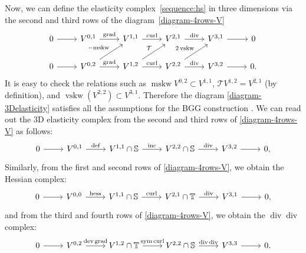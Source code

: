 \documentclass[final]{amsart}%
\newcommand{\0}{\mathaccent23}
\newcommand\inc{\operatorname{inc}}
\newcommand\vskw{\operatorname{vskw}}
\newcommand\mskw{\operatorname{mskw}}
\newcommand\sym{\operatorname{sym}}
\newcommand\grad{\operatorname{grad}}
\newcommand\deff{\operatorname{def}}
\renewcommand\div{\operatorname{div}}
\newcommand\curl{\operatorname{curl}}
\newcommand\dev{\mathrm{dev}}
\newcommand\hess{\operatorname{hess}}
\begin{document}
Now, we can define the elasticity complex~\eqref{sequence:hs} in three dimensions via the second and third rows of the diagram~\eqref{diagram-4rows-V}
\begin{equation}
  \label{diagram-3Delasticity}
  \begin{tikzcd}
  0 \arrow{r} &V^{0, 1} \arrow{r}{\grad} &V^{1, 1} \arrow{r}{\curl} & V^{2, 1} \arrow{r}{\div} & V^{3, 1} \arrow{r}{}& 0\\
  0 \arrow{r}&
  V^{0, 2}
  \arrow{r}{\grad} \arrow[ur, "-\mathrm{mskw}"]&
  V^{1, 2}  \arrow{r}{\curl} \arrow[ur, "\mathcal{T}"]&V^{2, 2}  \arrow{r}{\div} \arrow[ur, "2\vskw"]&V^{3, 2}  \arrow{r}{} & 0.
 \end{tikzcd}
\end{equation}
It is easy to check the relations such as  $\mskw V^{0, 2}\subset V^{1, 1}$, $\mathcal{T} V^{1, 2}= V^{2, 1}$ (by definition), and $\vskw (V^{2, 2})\subset V^{3, 1}$. Therefore the diagram \eqref{diagram-3Delasticity} satisfies all the assumptions for the BGG construction \cite{arnold2021complexes}. We can read out the 3D elasticity complex from the second and third rows of \eqref{diagram-4rows-V} as follows:
 \begin{equation} 
\begin{tikzcd}
0 \arrow{r} &V^{0, 1} \arrow{r}{\deff} &V^{1, 1}\cap \mathbb{S} \arrow{r}{\inc} & V^{2, 2}\cap \mathbb{S} \arrow{r}{\div} & V^{3, 2} \arrow{r}{}& 0,
 \end{tikzcd}
\end{equation}
Similarly, from the first and second rows of \eqref{diagram-4rows-V}, we obtain the Hessian complex:
 \begin{equation} 
\begin{tikzcd}
0 \arrow{r} &V^{0, 0} \arrow{r}{\hess } &V^{1, 1}\cap \mathbb{S} \arrow{r}{\curl} & V^{2, 1}\cap \mathbb{T} \arrow{r}{\div} & V^{3, 1} \arrow{r}{}& 0,
 \end{tikzcd}
\end{equation}
and from the third and fourth rows of \eqref{diagram-4rows-V}, we obtain the $\div\div$ complex:
 \begin{equation}  
\begin{tikzcd}
0 \arrow{r} &V^{0, 2} \arrow{r}{\dev\grad } &V^{1, 2}\cap \mathbb{T} \arrow{r}{\sym\curl} & V^{2, 2}\cap \mathbb{S} \arrow{r}{\div\div} & V^{3, 3} \arrow{r}{}& 0.
 \end{tikzcd}
\end{equation}

 
\end{document}
